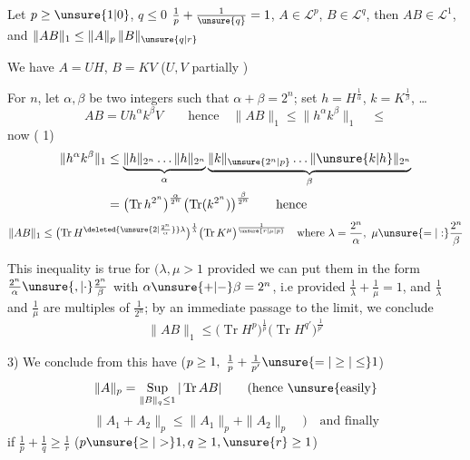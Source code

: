  Let $p\geq\unsure{1|0}$,
$q\leq0$ \quad $\frac1p+\frac1{\unsure{q}}=1$,
$A\in\mathcal L^p$, $B\in\mathcal L^q$, then $AB\in\mathcal L^1$, and
$\|AB\|_1\leq\|A\|_p\,\|B\|_{\unsure{q|r}}$

We have $A=UH$, $B=KV$ ($U,V$ partially )

For  $n$, let $\alpha,\beta$ be two integers such that $\alpha+\beta=2^n$;
set $h=H^{\frac1\alpha}$, $k=K^{\frac1\beta}$, \ldots
\[
AB=Uh^\alpha k^\beta V\qquad\text{hence}\quad\|AB\|_1\leq\|h^\alpha k^\beta\|_1\quad\leq
\]
now ( 1)
\[
\begin{aligned}
\|h^\alpha k^\beta\|_1&\leq
\underbrace{\|h\|_{2^n}\ldots\|h\|_{2^n}}_{\alpha}
\underbrace{\|k\|_{\unsure{2^n|p}}\ldots\|\unsure{k|h}\|_{2^n}}_{\beta}\\
&=\bigl(\operatorname{Tr} h^{2^n}\bigr)^{\frac\alpha{2^n}}
\bigl(\operatorname{Tr}(k^{2^n})\bigr)^{\frac\beta{2^n}}\qquad\text{hence}
\end{aligned}
\]
\[
\|AB\|_1\leq\bigl(\operatorname{Tr}H^{\deleted{\unsure{2|\frac{2^n}{\alpha}}}\lambda}\bigr)^{\frac1\lambda}
\bigl(\operatorname{Tr}K^\mu\bigr)^{\frac1{\unsure{r|\mu|p}}}
\quad\text{where }\lambda=\frac{2^n}{\alpha},\ \mu\unsure{=|:}\frac{2^n}{\beta}
\]

This inequality is true for  $(\lambda,\mu>1$ provided we can put them in the  form
$\frac{2^n}{\alpha}\unsure{,|\cdot}\frac{2^n}{\beta}$ with $\alpha\unsure{+|-}\beta=2^n$,
i.e provided $\frac1\lambda+\frac1\mu=1$, 
and $\frac1\lambda$ and $\frac1\mu$ are multiples of $\frac1{2^n}$;
by an immediate passage to the limit, we conclude
\[
\|AB\|_1\leq\bigl(\operatorname{Tr}H^p\bigr)^{\frac1p}
\bigl(\operatorname{Tr}H^{q'}\bigr)^{\frac1{p'}}
\]

3) We conclude from this  have ($p\geq1,\ \frac1p+\frac1{p'}\unsure{=|\geq|\leq}1$)
\[
\|A\|_p=\operatorname*{Sup}_{\|B\|_q\leq1}|\operatorname{Tr} AB|\qquad\text{(hence \unsure{easily}}
\]
\[
\|A_1+A_2\|_p\leq\|A_1\|_p+\|A_2\|_p\quad)\quad\text{and finally}
\]
 if $\frac1p+\frac1q\geq\frac1r$ \quad ($p\unsure{\geq|>}1,q\geq1,\unsure{r}\geq1$)
